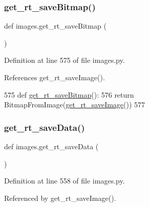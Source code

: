 \subsubsection{\texorpdfstring{get\+\_\+rt\+\_\+save\+Bitmap()}{get\_rt\_saveBitmap()}}
{\footnotesize\ttfamily def images.\+get\+\_\+rt\+\_\+save\+Bitmap (\begin{DoxyParamCaption}{ }\end{DoxyParamCaption})}



Definition at line 575 of file images.\+py.



References get\+\_\+rt\+\_\+save\+Image().


\begin{DoxyCode}
575 \textcolor{keyword}{def }\hyperlink{namespaceimages_aad395629cb6cf3619cbf6d101bd71240}{get\_rt\_saveBitmap}():
576     \textcolor{keywordflow}{return} BitmapFromImage(\hyperlink{namespaceimages_ac74de0ec00f14235b98b1398783e6f5f}{get\_rt\_saveImage}())
577 
\end{DoxyCode}
\mbox{\label{namespaceimages_ab57eaafe3165ec3e04e68b392b4e32af}} 
\subsubsection{\texorpdfstring{get\+\_\+rt\+\_\+save\+Data()}{get\_rt\_saveData()}}
{\footnotesize\ttfamily def images.\+get\+\_\+rt\+\_\+save\+Data (\begin{DoxyParamCaption}{ }\end{DoxyParamCaption})}



Definition at line 558 of file images.\+py.



Referenced by get\+\_\+rt\+\_\+save\+Image().


